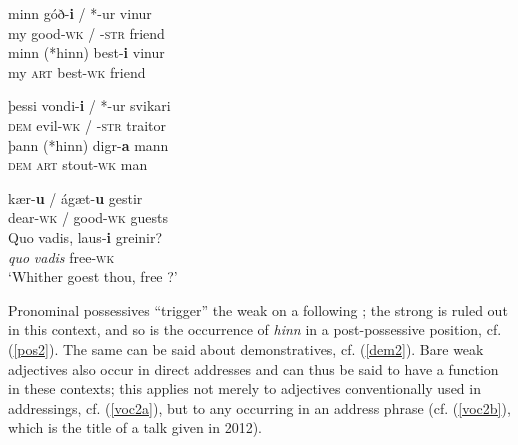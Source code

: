 \documentclass[output=paper,colorlinks,citecolor=brown]{langscibook}
\begin{document}
\begin{exe}
\ex  \label{pos2}
    \begin{xlist}
       \ex\gll  minn góð-\textbf{i} / *-ur vinur     \\ 
        my good-\textsc{wk} / \phantom{*}-\textsc{str} friend  \\    
        \ex\gll minn (*hinn) best-\textbf{i}  vinur   \\ 
        my \phantom{(*}\textsc{art}  best\textsc{-wk} friend  \\     
\end{xlist} 
\end{exe} 
\begin{exe}
\ex  \label{dem2}  
    \begin{xlist}
         \ex\gll þessi vondi-\textbf{i} / *-ur svikari     \\   
         \textsc{dem} evil-\textsc{wk} / \phantom{*}-\textsc{str} traitor \\ 
         \ex\gll þann  (*hinn) digr-\textbf{a} mann  \\ 
          \textsc{dem} \phantom{(*}\textsc{art} stout-\textsc{wk} man \\     
\end{xlist} 
\end{exe} 
\begin{exe}
\ex   \label{voc2}
    \begin{xlist}
         \ex  \label{voc2a} \gll kær-\textbf{u} / ágæt-\textbf{u} gestir  \\ 
         dear-\textsc{wk} / good-\textsc{wk} guests  \\    
         \ex  \label{voc2b} \gll   Quo vadis, laus-\textbf{i}  greinir?  \\ 
         \textit{quo} \textit{vadis} free-\textsc{wk}  \\   
         \glt `Whither goest thou, free ?'
\end{xlist} 
\end{exe}  


Pronominal possessives ``trigger'' the weak  on a following ; the strong  is ruled out in this context, and so is the occurrence of \textit{hinn}  in a post-possessive position, cf. (\ref{pos2}).  The same can be said about demonstratives, cf. (\ref{dem2}). 
Bare weak adjectives also occur in direct addresses and can thus be said to have a  function in these contexts; this applies not merely to adjectives conventionally used in addressings, cf. (\ref{voc2a}),  but to any  occurring in an address  phrase (cf. (\ref{voc2b}), which is the title of a talk given in 2012).
\end{document}
